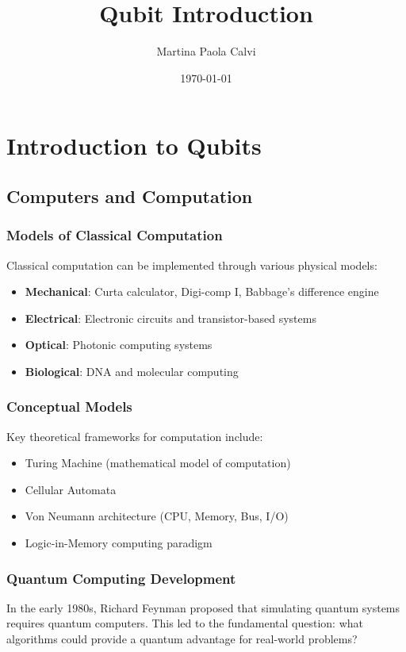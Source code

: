 \documentclass{article}
\title{Qubit Introduction}
\author{Martina Paola Calvi}
\date{\today}
\begin{document}
\maketitle
\tableofcontents
\newpage

\section{Introduction to Qubits}
\subsection{Computers and Computation}

\subsubsection*{Models of Classical Computation}
Classical computation can be implemented through various physical models:
\begin{itemize}
    \item \textbf{Mechanical}: Curta calculator, Digi-comp I, Babbage's difference engine
    \item \textbf{Electrical}: Electronic circuits and transistor-based systems
    \item \textbf{Optical}: Photonic computing systems
    \item \textbf{Biological}: DNA and molecular computing
\end{itemize}

\subsubsection*{Conceptual Models}
Key theoretical frameworks for computation include:
\begin{itemize}
    \item Turing Machine (mathematical model of computation)
    \item Cellular Automata
    \item Von Neumann architecture (CPU, Memory, Bus, I/O)
    \item Logic-in-Memory computing paradigm
\end{itemize}

\subsubsection*{Quantum Computing Development}

In the early 1980s, Richard Feynman proposed that simulating quantum systems requires quantum computers. This led to the fundamental question: what algorithms could provide a quantum advantage for real-world problems?
\end{document}
